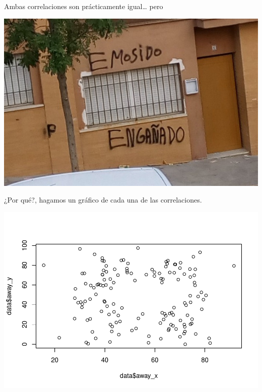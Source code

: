 \documentclass[
]{book}
\newenvironment{Shaded}{\begin{snugshade}}{\end{snugshade}}
\newcommand{\FunctionTok}[1]{\textcolor[rgb]{0.00,0.00,0.00}{#1}}
\newcommand{\NormalTok}[1]{#1}
\newcommand{\SpecialCharTok}[1]{\textcolor[rgb]{0.00,0.00,0.00}{#1}}
\begin{document}
Ambas correlaciones son prácticamente igual\ldots{} pero

\includegraphics[width=8.75in]{img/emosido}

¿Por qué?, hagamos un gráfico de cada una de las correlaciones.

\begin{Shaded}
\end{Shaded}

\includegraphics{Esatadistica_en_R_files/figure-latex/unnamed-chunk-217-1.pdf}

\begin{Shaded}
\end{Shaded}
\end{document}

